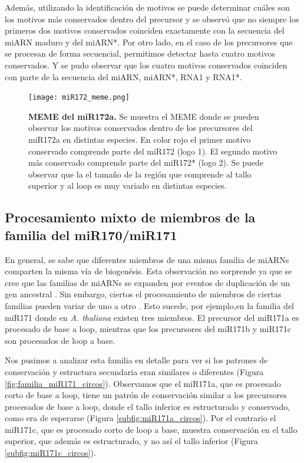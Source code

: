 Además, utilizando la identificación de motivos se puede determinar cuáles son los motivos más conservados dentro del precursor y se observó que no siempre los primeros dos motivos conservados coinciden exactamente con la secuencia del miARN maduro y del miARN*.
Por otro lado, en el caso de los precursores que se procesan de forma secuencial, permitimos detectar hasta cuatro motivos conservados.
Y se pudo observar que los cuatro motivos conservados coinciden con parte de la secuencia del miARN, miARN*, RNA1 y RNA1*.

\begin{landscape}
    \begin{figure}[htbp!] 
        \centering    
        \texttt{[image: miR172\_meme.png]}
        \caption[MEME del miR172a]{
			\textbf{MEME del miR172a.}
        Se muestra el MEME donde se pueden observar los motivos conservados dentro de los precursores del miR172a en distintas especies.
        En color rojo el primer motivo conservado comprende parte del miR172 (logo 1).
        El segundo motivo más conservado comprende parte del miR172* (logo 2).
        Se puede observar que la el tamaño de la región que comprende al tallo superior y al loop es muy variado en distintas especies.
        }
        \label{fig:miR172_meme}
    \end{figure}
\end{landscape}


\subsection{Procesamiento mixto de miembros de la familia del miR170/miR171}

En general, se sabe que diferentes miembros de una misma familia de miARNs comparten la misma vía de biogenésis. 
Esta observación no sorprende ya que se cree que las familias de miARNs se expanden por eventos de duplicación de un gen ancestral \citep{pmid15565108}.
Sin embargo, ciertos el procesamiento de miembros de ciertas familias pueden variar de uno a otro \citep{Bologna2013}.
Esto sucede, por ejemplo,en la familia del miR171 donde en \textit{A. thaliana} existen tres miembros. 
El precursor del miR171a es procesado de base a loop, mientras que los precursores del miR171b y miR171c son procesados de loop a base.

Nos pusimos a analizar esta familia en detalle para ver si los patrones de conservación y estructura secundaria eran similares o diferentes (Figura \ref{fig:familia_miR171_circos}).
Observamos que el miR171a, que es procesado corto de base a loop, tiene un patrón de conservación similar a los precursores procesados de base a loop, donde el tallo inferior es estructurado y conservado, como era de esperarse (Figura \ref{subfig:miR171a_circos}).
Por el contrario el miR171c, que es procesado corto de loop a base, muestra conservación en el tallo superior, que además es estructurado, y no así el tallo inferior (Figura \ref{subfig:miR171c_circos}).


